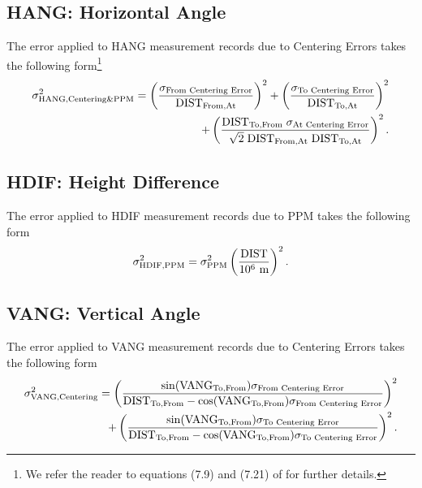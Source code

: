 \subsection{HANG: Horizontal Angle}
The error applied to HANG measurement records due to Centering Errors takes the following form\footnote{We refer the reader to equations (7.9) and (7.21) of \cite{ghilani} for further details.}
\begin{eqnarray}
\sigma_{\text{HANG,Centering\&PPM}}^2=\left(\frac{\sigma_{\text{From Centering Error}}}{\text{DIST}_{\text{From,At}}}\right)^2+\left(\frac{\sigma_{\text{To Centering Error}}}{\text{DIST}_{\text{To,At}}}\right)^2&\\\nonumber
+\left(\frac{\text{DIST}_{\text{To,From}}\hspace*{1mm}\sigma_{\text{At Centering Error}}}{\sqrt{2}\hspace*{1mm}\text{DIST}_{\text{From,At}}\hspace*{1mm}\text{DIST}_{\text{To,At}}}\right)^2.
\end{eqnarray}

\subsection{HDIF: Height Difference}
The error applied to HDIF measurement records due to PPM takes the following form
\begin{equation}
\sigma_{\text{HDIF,PPM}}^2=\sigma_{\text{PPM}}^2\left(\frac{\text{DIST}}{10^6\text{ m}}\right)^2.
\end{equation}

\subsection{VANG: Vertical Angle}
The error applied to VANG measurement records due to Centering Errors takes the following form
\begin{eqnarray}
\sigma_{\text{VANG,Centering}}^2=\left(\frac{\sin(\text{VANG}_{\text{To,From}})\sigma_{\text{From Centering Error}}}{\text{DIST}_{\text{To,From}}-\cos(\text{VANG}_{\text{To,From}})\sigma_{\text{From Centering Error}}}\right)^2&\\\nonumber
+\left(\frac{\sin(\text{VANG}_{\text{To,From}})\sigma_{\text{To Centering Error}}}{\text{DIST}_{\text{To,From}}-\cos(\text{VANG}_{\text{To,From}})\sigma_{\text{To Centering Error}}}\right)^2.
\end{eqnarray}

